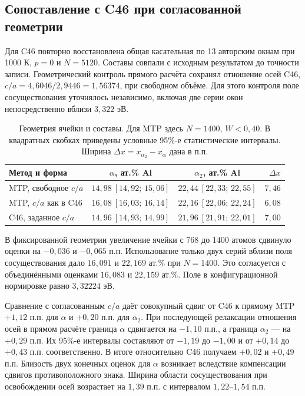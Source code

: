 \subsection{Сопоставление с C46 при согласованной геометрии}
\label{sec:bulk-c46}

Для C46 повторно восстановлена общая касательная по 13 авторским
окнам при 1000 К, $p=0$ и $N=5120$. Составы совпали с исходным
результатом до точности записи. Геометрический контроль прямого
расчёта сохранял отношение осей C46, $c/a=4{,}6046/2{,}9446
=1{,}56374$, при свободном объёме. Для этого контроля поле
сосуществования уточнялось независимо, включая две серии окон
непосредственно вблизи $3{,}322$ эВ.

\begin{table}[htbp]
\centering\small
\caption{Геометрия ячейки и составы. Для MTP здесь $N=1400$,
$W<0{,}40$. В квадратных скобках приведены условные 95\%-е
статистические интервалы. Ширина $\Delta x=x_{\alpha_2}-x_{\alpha}$
дана в п.п.}
\label{tab:bulk-c46}
\begin{tabular}{@{}l c c r@{}}
\toprule
Метод и форма & $\alpha$, ат.\% Al & $\alpha_2$, ат.\% Al & $\Delta x$\\
\midrule
MTP, свободное $c/a$ & $14{,}98\ [14{,}92;\,15{,}06]$ & $22{,}44\ [22{,}33;\,22{,}55]$ & $7{,}46$\\
MTP, $c/a$ как в C46 & $16{,}08\ [16{,}03;\,16{,}14]$ & $22{,}16\ [22{,}06;\,22{,}24]$ & $6{,}08$\\
C46, заданное $c/a$ & $14{,}96\ [14{,}93;\,14{,}99]$ & $21{,}96\ [21{,}91;\,22{,}01]$ & $7{,}00$\\
\bottomrule
\end{tabular}
\end{table}

В фиксированной геометрии увеличение ячейки с 768 до 1400 атомов
сдвинуло оценки на $-0{,}036$ и $-0{,}065$ п.п. Использование
только двух серий вблизи поля сосуществования дало
$16{,}091$ и $22{,}169$ ат.\% при $N=1400$. Это согласуется
с объединёнными оценками $16{,}083$ и $22{,}159$ ат.\%.
Поле в конфигурационной нормировке равно $3{,}32224$ эВ.

Сравнение с согласованным $c/a$ даёт совокупный сдвиг от C46
к прямому MTP $+1{,}12$ п.п. для $\alpha$ и $+0{,}20$ п.п.
для $\alpha_2$. При последующей релаксации отношения осей в прямом
расчёте граница $\alpha$ сдвигается на $-1{,}10$ п.п.,
а граница $\alpha_2$ --- на $+0{,}29$ п.п. Их 95\%-е интервалы
составляют от $-1{,}19$ до $-1{,}00$ и от $+0{,}14$ до
$+0{,}43$ п.п. соответственно.
В итоге относительно C46 получаем $+0{,}02$ и $+0{,}49$ п.п.
Близость двух конечных оценок для $\alpha$ возникает вследствие
компенсации сдвигов противоположного знака. Ширина области
сосуществования при освобождении осей возрастает на $1{,}39$ п.п.
с интервалом $1{,}22$--$1{,}54$ п.п.

